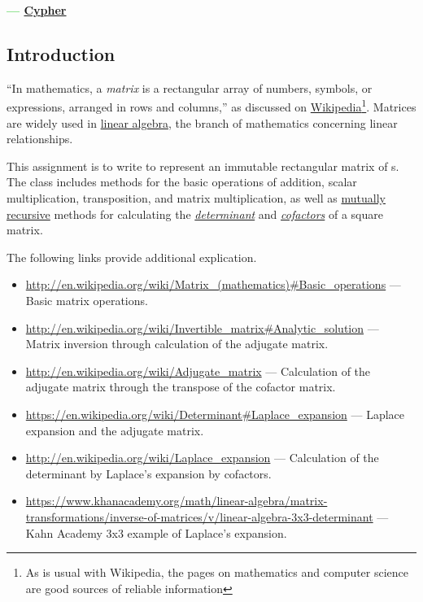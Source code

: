 \documentclass{article}%
\begin{document}
\setlength{\baselineskip}{1.2\baselineskip}%

\begin{tcolorbox}[colback=Black,colframe=Black]\textcolor{LimeGreen}{\bf{} --- \href{http://matrix.wikia.com/wiki/Cypher}{Cypher}}\end{tcolorbox}
\begin{multicols}{2}

\section{Introduction}
\label{Introduction}

``In mathematics, a {\em matrix} is a rectangular array of numbers, symbols, or expressions, arranged in rows and columns,'' as discussed on \href{https://en.wikipedia.org/wiki/Matrix_(mathematics)}{Wikipedia}\footnote{As is usual with Wikipedia, the pages on mathematics and computer science are good sources of reliable information}. Matrices are widely used in \href{https://en.wikipedia.org/wiki/Linear_algebra}{linear algebra}, the branch of mathematics concerning linear relationships.

This assignment is to write  to represent an immutable rectangular matrix of s. The class includes methods for the basic operations of addition, scalar multiplication, transposition, and matrix multiplication, as well as \href{https://en.wikipedia.org/wiki/Mutual_recursion}{mutually recursive} methods for calculating the {\em \href{http://en.wikipedia.org/wiki/Determinant}{determinant}} and {\em \href{https://en.wikipedia.org/wiki/Minor_(linear_algebra)\#Applications_of_minors_and_cofactors}{cofactors}} of a square matrix.

The following links provide additional explication.
\begin{itemize}\sloppy
\item \url{http://en.wikipedia.org/wiki/Matrix_(mathematics)\#Basic_operations} --- Basic matrix operations.
\item \url{http://en.wikipedia.org/wiki/Invertible_matrix\#Analytic_solution} --- Matrix inversion through calculation of the adjugate matrix.
\item \url{http://en.wikipedia.org/wiki/Adjugate_matrix} --- Calculation of the adjugate matrix through the transpose of the cofactor matrix.
\item \url{https://en.wikipedia.org/wiki/Determinant\#Laplace_expansion} --- Laplace expansion and the adjugate matrix.
\item \url{http://en.wikipedia.org/wiki/Laplace_expansion} --- Calculation of the determinant by Laplace's expansion by cofactors.
\item\url{https://www.khanacademy.org/math/linear-algebra/matrix-transformations/inverse-of-matrices/v/linear-algebra-3x3-determinant} --- Kahn Academy 3x3 example of Laplace's expansion.
\end{itemize}


\end{multicols}
\end{document}
